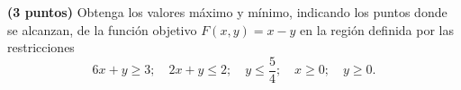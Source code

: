 
\textbf{(3 puntos)} Obtenga los valores máximo y mínimo, indicando los puntos donde se alcanzan, de la función objetivo $F(x,y)=x-y$ en la región definida por las restricciones
\[
6x+y\geq3;\quad2x+y\leq2;\quad y\leq\frac{5}{4};\quad x\geq0;\quad y\geq0.
\]
